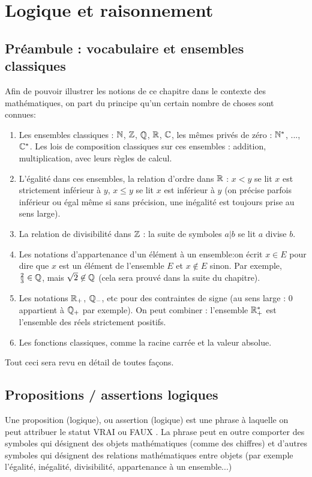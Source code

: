 \chapter{Logique et raisonnement}
\minitoc
\hyperlink{toc}{\retourTOC}

\section{Préambule : vocabulaire et ensembles classiques}
Afin de pouvoir illustrer les notions de ce chapitre dans le contexte des mathématiques, on part du principe qu'un certain nombre de choses sont connues:

\begin{enumerate}
\item Les ensembles classiques :  $\mathbb{N}$, $\mathbb{Z}$, $\mathbb{Q}$, $\mathbb{R}$, $\mathbb{C}$, les mêmes privés de zéro : $\mathbb{N}^*$, ..., $\mathbb{C}^*$. Les lois de composition classiques sur ces ensembles : addition, multiplication, avec leurs règles de calcul.
\item L'égalité dans ces ensembles, la relation d'ordre dans $\mathbb{R}$ : $x< y$ se lit \og$x$ est strictement inférieur à $y$\fg, $x\leq y$ se lit \og $x$ est inférieur à $y$\fg{} (on précise parfois \og inférieur ou égal\fg{} même si sans précision, une inégalité est toujours prise au sens large).
\item La relation de divisibilité dans $\mathbb{Z}$ : la suite de symboles $a|b$ se lit \og $a$ divise $b$\fg.
\item Les notations d'appartenance d'un élément à un ensemble:on écrit $x \in E$ pour dire que $x$ est un élément de l'ensemble $E$ et $x\not\in E$ sinon. Par exemple, $\frac23 \in \mathbb{Q}$, mais $\sqrt{2} \not\in\mathbb{Q}$ (cela sera prouvé dans la suite du chapitre). 
\item Les notations $\mathbb{R}_+$, $\mathbb{Q}_-$, etc pour des contraintes de signe (au sens large : $0$ appartient à $\mathbb{Q}_+$ par exemple). On peut combiner : l'ensemble $\mathbb{R}_+^*$ est l'ensemble des réels strictement positifs. 
\item Les fonctions classiques, comme la racine carrée et la valeur absolue.
\end{enumerate}

Tout ceci sera revu en détail de toutes façons.


\section{Propositions / assertions logiques}

\begin{definition}
Une proposition (logique), ou assertion (logique) est une phrase à laquelle on peut attribuer le statut \og VRAI\fg{} ou \og FAUX \fg{}. La phrase peut en outre comporter des symboles qui désignent des objets mathématiques (comme des chiffres) et d'autres symboles qui désignent des relations mathématiques entre objets (par exemple l'égalité, inégalité, divisibilité, appartenance à un ensemble...)
\end{definition}

